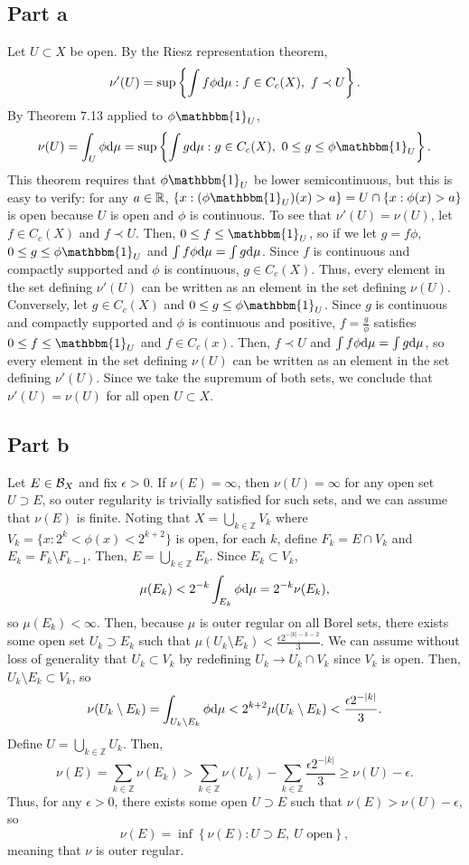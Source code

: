 \documentclass{article}
\begin{document}
\subsection{Part a}
Let $U\subset X$ be open. By the Riesz representation theorem,
\[
\nu'(U)=\sup\left\{\int f\phi\mathrm{d}\mu:f\in C_c(X),~f\prec U\right\}.
\]
By Theorem 7.13 applied to $\phi\mathbbm{1}_U$,
\[
\nu(U)=\int_U\phi\df\mu=\sup\left\{\int g\df\mu:g\in C_c(X),~0\leq g\leq\phi\mathbbm{1}_U\right\}.
\]
This theorem requires that $\phi\mathbbm{1}_U$ be lower semicontinuous, but this is easy to verify: for any $a\in\mathbb{R}$, $\{x:(\phi\mathbbm{1}_U)(x)>a\}=U\cap\{x:\phi(x)>a\}$ is open because $U$ is open and $\phi$ is continuous. To see that $\nu'(U)=\nu(U)$, let $f\in C_c(X)$ and $f\prec U$. Then, $0\leq f\leq\mathbbm{1}_U$, so if we let $g=f\phi$, $0\leq g\leq\phi\mathbbm{1}_U$ and $\int f\phi\mathrm{d}\mu=\int g\mathrm{d}\mu$. Since $f$ is continuous and compactly supported and $\phi$ is continuous, $g\in C_c(X)$. Thus, every element in the set defining $\nu'(U)$ can be written as an element in the set defining $\nu(U)$. Conversely, let $g\in C_c(X)$ and $0\leq g\leq\phi\mathbbm{1}_U$. Since $g$ is continuous and compactly supported and $\phi$ is continuous and positive, $f=\frac{g}{\phi}$ satisfies $0\leq f\leq\mathbbm{1}_U$ and $f\in C_c(x)$. Then, $f\prec U$ and $\int f\phi\mathrm{d}\mu=\int g\mathrm{d}\mu$, so every element in the set defining $\nu(U)$ can be written as an element in the set defining $\nu'(U)$. Since we take the supremum of both sets, we conclude that $\nu'(U)=\nu(U)$ for all open $U\subset X$. 

\subsection{Part b}
Let $E\in{\cal B}_X$ and fix $\epsilon>0$. If $\nu(E)=\infty$, then $\nu(U)=\infty$ for any open set $U\supset E$, so outer regularity is trivially satisfied for such sets, and we can assume that $\nu(E)$ is finite. Noting that $X=\bigcup_{k\in\mathbb{Z}}V_k$ where $V_k=\{x:2^k<\phi(x)<2^{k+2}\}$ is open, for each $k$, define $F_k=E\cap V_k$ and $E_k=F_k\setminus F_{k-1}$. Then, $E=\bigcup_{k\in\mathbb{Z}}E_k$. Since $E_k\subset V_k$,
\[
\mu(E_k)<2^{-k}\int_{E_k}\phi\mathrm{d}\mu=2^{-k}\nu(E_k),
\]
so $\mu(E_k)<\infty$. Then, because $\mu$ is outer regular on all Borel sets, there exists some open set $U_k\supset E_k$ such that $\mu(U_k\setminus E_k)<\frac{\epsilon2^{-|k|-k-2}}{3}$. We can assume without loss of generality that $U_k\subset V_k$ by redefining $U_k\to U_k\cap V_k$ since $V_k$ is open. Then, $U_k\setminus E_k\subset V_k$, so
\[
\nu(U_k\setminus E_k)=\int_{U_k\setminus E_k}\phi\mathrm{d}\mu<2^{k+2}\mu(U_k\setminus E_k)<\frac{\epsilon2^{-|k|}}{3}.
\]
Define $U=\bigcup_{k\in\mathbb{Z}}U_k$. Then,
\[
\nu(E)=\sum_{k\in\mathbb{Z}}\nu(E_k)>\sum_{k\in\mathbb{Z}}\nu(U_k)-\sum_{k\in\mathbb{Z}}\frac{\epsilon2^{-|k|}}{3}\geq\nu(U)-\epsilon.
\]
Thus, for any $\epsilon>0$, there exists some open $U\supset E$ such that $\nu(E)>\nu(U)-\epsilon$, so
\[
\nu(E)=\inf\left\{\nu(E):U\supset E,~U\text{ open}\right\},
\]
meaning that $\nu$ is outer regular.
\end{document}

